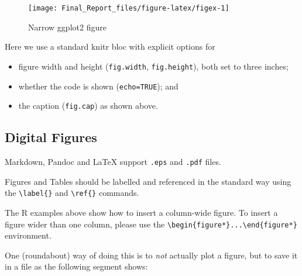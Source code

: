 \documentclass[letterpaper,10pt,twocolumn,twoside,]{pinp}
\providecommand{\tightlist}{%
  \setlength{\itemsep}{0pt}\setlength{\parskip}{0pt}}
\begin{document}
\begin{Shaded}
\begin{Highlighting}[]
\SpecialCharTok{+}
    \NormalTok{(}\NormalTok{, }\NormalTok{(}\SpecialCharTok{+}
    \NormalTok{(}\NormalTok{)}
\end{Highlighting}
\end{Shaded}

\begin{figure}

{\centering \texttt{[image: Final\_Report\_files/figure-latex/figex-1]} 

}

\caption{Narrow ggplot2 figure}\label{fig:figex}
\end{figure}

Here we use a standard knitr bloc with explicit options for

\begin{itemize}
\tightlist
\item
  figure width and height (\texttt{fig.width}, \texttt{fig.height}),
  both set to three inches;
\item
  whether the code is shown (\texttt{echo=TRUE}); and
\item
  the caption (\texttt{fig.cap}) as shown above.
\end{itemize}

\hypertarget{digital-figures}{%
\subsection{Digital Figures}\label{digital-figures}}

Markdown, Pandoc and LaTeX support \texttt{.eps} and \texttt{.pdf}
files.

Figures and Tables should be labelled and referenced in the standard way
using the \texttt{\textbackslash{}label\{\}} and
\texttt{\textbackslash{}ref\{\}} commands.

The R examples above show how to insert a column-wide figure. To insert
a figure wider than one column, please use the
\texttt{\textbackslash{}begin\{figure*\}...\textbackslash{}end\{figure*\}}
environment.

One (roundabout) way of doing this is to \emph{not} actually plot a
figure, but to save it in a file as the following segment shows:
\end{document}
